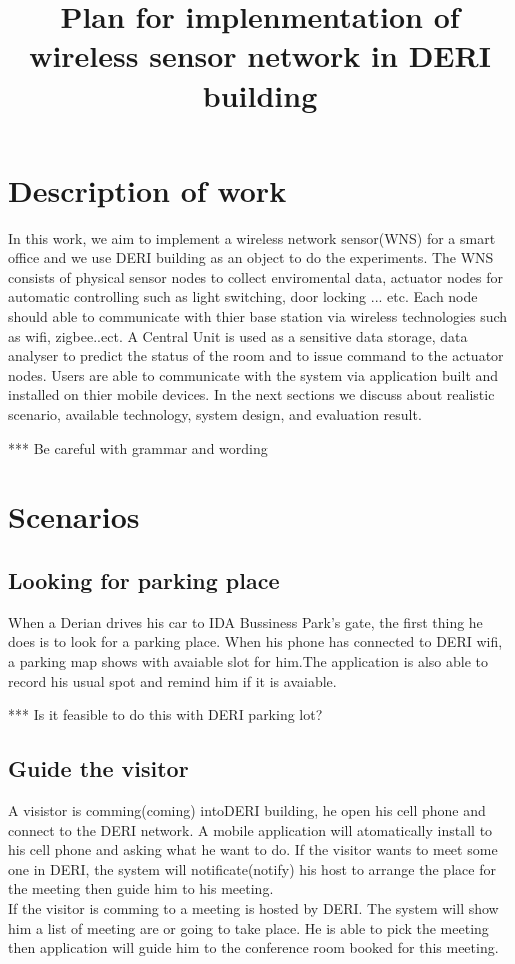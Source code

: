 \documentclass[a4paper, 12pt]{article}
\begin{document}
\title{Plan for implenmentation of wireless sensor network in DERI building}
\maketitle
\section{Description of work}
In this work, we aim to implement a wireless network sensor(WNS) for a smart office and we use DERI building as an object to do the experiments. The WNS consists of physical sensor nodes to collect enviromental data, actuator nodes for automatic controlling such as light switching, door locking ... etc.  Each node should able to communicate with thier base station via wireless technologies such as wifi, zigbee..ect. A Central Unit is used as a sensitive data storage, data analyser to predict the status of the room and to  issue command to the actuator nodes. Users are able to communicate with the system via application built and installed on thier mobile devices. In the next sections we discuss about realistic scenario, available technology, system design, and evaluation result.

*** Be careful with grammar and wording

\section{Scenarios}
\subsection{Looking for parking place}
 When a Derian drives his car to IDA Bussiness Park's gate, the first thing he does is to look for a parking place. When his phone has connected to DERI wifi, a parking map shows with avaiable slot for him.The application is also able to record his usual spot and remind him if it is avaiable.

*** Is it feasible to do this with DERI parking lot?

\subsection{Guide the visitor}
 A visistor is comming(coming) intoDERI building, he open his cell phone and connect to the DERI network. A mobile application will atomatically install to his cell phone and asking what he want to do. 
 If the visitor wants to meet some one in DERI, the system will notificate(notify) his host to arrange the place for the meeting then guide him to his meeting.\\
 If the visitor is comming to a meeting is hosted by DERI. The system will show him a list of meeting are or going to take place. He is able to pick the meeting then application will guide him to the conference room booked for this meeting.
 
\end{document}
